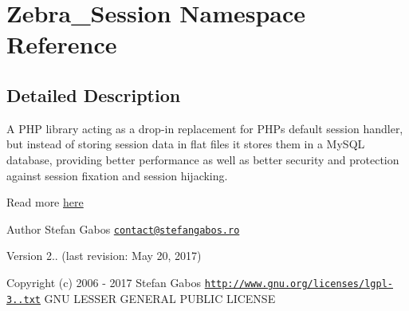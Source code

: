 \hypertarget{namespace_zebra___session}{}\section{Zebra\+\_\+\+Session Namespace Reference}
\label{namespace_zebra___session}


\subsection{Detailed Description}
A P\+HP library acting as a drop-\/in replacement for P\+HP\textquotesingle{}s default session handler, but instead of storing session data in flat files it stores them in a My\+S\+QL database, providing better performance as well as better security and protection against session fixation and session hijacking.

Read more \mbox{\hyperlink{}{here}}

\begin{DoxyAuthor}{Author}
Stefan Gabos \href{mailto:contact@stefangabos.ro}{\tt contact@stefangabos.\+ro} 
\end{DoxyAuthor}
\begin{DoxyVersion}{Version}
2.. (last revision\+: May 20, 2017) 
\end{DoxyVersion}
\begin{DoxyCopyright}{Copyright}
(c) 2006 -\/ 2017 Stefan Gabos  \href{http://www.gnu.org/licenses/lgpl-3.0.txt}{\tt http\+://www.\+gnu.\+org/licenses/lgpl-\/3..\+txt} G\+NU L\+E\+S\+S\+ER G\+E\+N\+E\+R\+AL P\+U\+B\+L\+IC L\+I\+C\+E\+N\+SE 
\end{DoxyCopyright}
